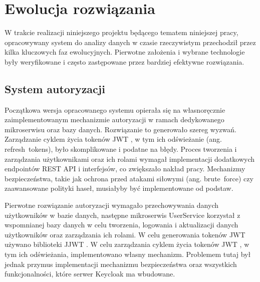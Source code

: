 \section{Ewolucja rozwiązania}
\label{chap:ewolucja_rozwiazania}


W trakcie realizacji niniejszego projektu będącego tematem niniejszej pracy, opracowywany system do analizy danych w czasie rzeczywistym przechodził przez kilka kluczowych faz ewolucyjnych. 
Pierwotne założenia i wybrane technologie były weryfikowane i często zastępowane przez bardziej efektywne rozwiązania.

\subsection{System autoryzacji}

Początkowa wersja opracowanego systemu opierała się na własnoręcznie zaimplementowanym mechanizmie autoryzacji w ramach dedykowanego mikroserwisu oraz bazy danych. Rozwiązanie to generowało szereg wyzwań. Zarządzanie cyklem życia tokenów JWT \cite{jwt_rfc}, w tym ich odświeżanie (ang. \mbox{refresh tokens}), było skomplikowane i podatne na błędy. Proces tworzenia i zarządzania użytkownikami oraz ich rolami wymagał implementacji dodatkowych endpointów REST API i interfejsów, co zwiększało nakład pracy. Mechanizmy bezpieczeństwa, takie jak ochrona przed atakami siłowymi (ang. \mbox{brute force}) czy zaawansowane polityki haseł, musiałyby być implementowane od podstaw.

Pierwotne rozwiązanie autoryzacji wymagało przechowywania danych użytkowników w bazie danych, następne mikroserwis UserService korzystał z wspomnianej bazy danych w celu tworzenia, logowania i aktualizacji danych użytkowników oraz zarządzania ich rolami. W celu generowania tokenów JWT \cite{jwt_rfc} używano biblioteki JJWT \cite{jjwt_docs}. W celu zarządzania cyklem życia tokenów JWT \cite{jwt_rfc}, w tym ich odświeżania, implementowano własny mechanizm. Problemem tutaj był jednak przymus implementacji mechanizmu bezpieczeństwa oraz wszystkich funkcjonalności, które serwer Keycloak ma wbudowane.

\vspace{0.3em}

